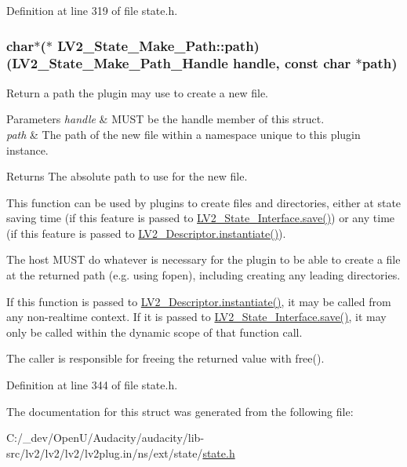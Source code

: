 Definition at line 319 of file state.\+h.

\subsubsection[{\texorpdfstring{path}{path}}]{\setlength{\rightskip}{0pt plus 5cm}char$\ast$($\ast$ L\+V2\+\_\+\+State\+\_\+\+Make\+\_\+\+Path\+::path) ({\bf L\+V2\+\_\+\+State\+\_\+\+Make\+\_\+\+Path\+\_\+\+Handle} {\bf handle}, {\bf const} char $\ast$path)}\hypertarget{struct_l_v2___state___make___path_a1a459dc25d020171013bc8826614897e}{}\label{struct_l_v2___state___make___path_a1a459dc25d020171013bc8826614897e}
Return a path the plugin may use to create a new file. 
\begin{DoxyParams}{Parameters}
{\em handle} & M\+U\+ST be the {\ttfamily handle} member of this struct. \\
\hline
{\em path} & The path of the new file within a namespace unique to this plugin instance. \\
\hline
\end{DoxyParams}
\begin{DoxyReturn}{Returns}
The absolute path to use for the new file.
\end{DoxyReturn}
This function can be used by plugins to create files and directories, either at state saving time (if this feature is passed to \hyperlink{struct___l_v2___state___interface_ae564742663a6d908d9745c9eb8bdb347}{L\+V2\+\_\+\+State\+\_\+\+Interface.\+save()}) or any time (if this feature is passed to \hyperlink{struct___l_v2___descriptor_a2f7e1c335ddf27d3a0017207421fe9f5}{L\+V2\+\_\+\+Descriptor.\+instantiate()}).

The host M\+U\+ST do whatever is necessary for the plugin to be able to create a file at the returned path (e.\+g. using fopen), including creating any leading directories.

If this function is passed to \hyperlink{struct___l_v2___descriptor_a2f7e1c335ddf27d3a0017207421fe9f5}{L\+V2\+\_\+\+Descriptor.\+instantiate()}, it may be called from any non-\/realtime context. If it is passed to \hyperlink{struct___l_v2___state___interface_ae564742663a6d908d9745c9eb8bdb347}{L\+V2\+\_\+\+State\+\_\+\+Interface.\+save()}, it may only be called within the dynamic scope of that function call.

The caller is responsible for freeing the returned value with free(). 

Definition at line 344 of file state.\+h.



The documentation for this struct was generated from the following file\+:\begin{DoxyCompactItemize}
\item 
C\+:/\+\_\+dev/\+Open\+U/\+Audacity/audacity/lib-\/src/lv2/lv2/lv2/lv2plug.\+in/ns/ext/state/\hyperlink{state_8h}{state.\+h}\end{DoxyCompactItemize}

